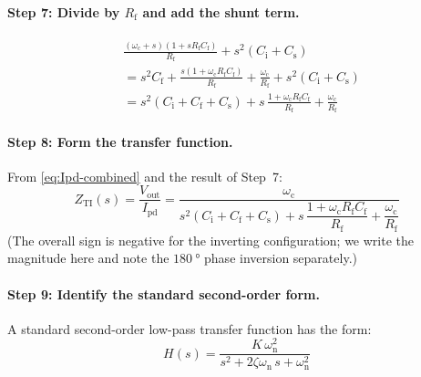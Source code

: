 \documentclass[a4paper,11pt]{article}
\begin{document}
\paragraph{Step 7: Divide by $R_{\mathrm{f}}$ and add the shunt term.}

\begin{align*}
  &\frac{(\omega_{\mathrm{c}} + s)
        (1 + sR_{\mathrm{f}}C_{\mathrm{f}})}
       {R_{\mathrm{f}}}
  + s^2(C_{\mathrm{i}} + C_{\mathrm{s}}) \\
  &= s^2 C_{\mathrm{f}}
   + \frac{s(1 + \omega_{\mathrm{c}} R_{\mathrm{f}} C_{\mathrm{f}})}
          {R_{\mathrm{f}}}
   + \frac{\omega_{\mathrm{c}}}{R_{\mathrm{f}}}
   + s^2(C_{\mathrm{i}} + C_{\mathrm{s}}) \\
  &= s^2(C_{\mathrm{i}} + C_{\mathrm{f}} + C_{\mathrm{s}})
   + s\,\frac{1 + \omega_{\mathrm{c}} R_{\mathrm{f}} C_{\mathrm{f}}}
             {R_{\mathrm{f}}}
   + \frac{\omega_{\mathrm{c}}}{R_{\mathrm{f}}}
\end{align*}

\paragraph{Step 8: Form the transfer function.}

From \eqref{eq:Ipd-combined} and the result of Step~7:
\begin{equation}
  Z_{\mathrm{TI}}(s)
  = \frac{V_{\mathrm{out}}}{I_{\mathrm{pd}}}
  = \frac{\omega_{\mathrm{c}}}
         {s^2(C_{\mathrm{i}} + C_{\mathrm{f}} + C_{\mathrm{s}})
          + s\,\dfrac{1 + \omega_{\mathrm{c}}
          R_{\mathrm{f}} C_{\mathrm{f}}}{R_{\mathrm{f}}}
          + \dfrac{\omega_{\mathrm{c}}}{R_{\mathrm{f}}}}
  \label{eq:Zti-raw}
\end{equation}
(The overall sign is negative for the inverting configuration; we write
the magnitude here and note the $\SI{180}{\degree}$ phase inversion
separately.)

\paragraph{Step 9: Identify the standard second-order form.}

A standard second-order low-pass transfer function has the form:
\begin{equation*}
  H(s) = \frac{K\,\omega_{\mathrm{n}}^2}
              {s^2 + 2\zeta\omega_{\mathrm{n}}\,s
               + \omega_{\mathrm{n}}^2}
\end{equation*}
\end{document}
